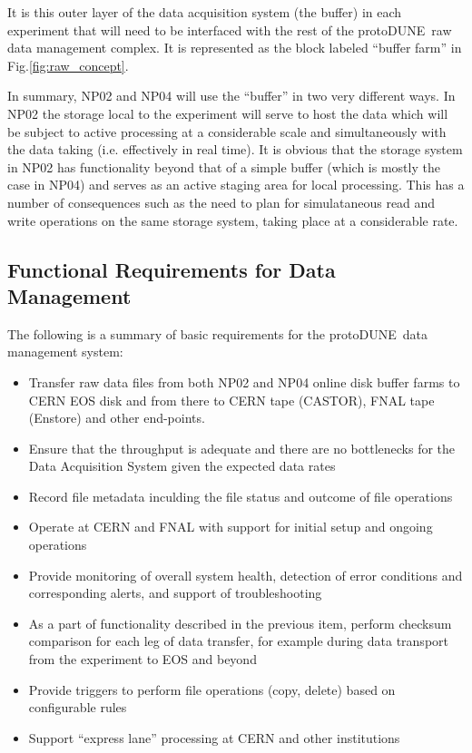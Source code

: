 \documentclass[pdftex,12pt,letter]{article}
\newcommand{\pd}{protoDUNE\ }
\begin{document}
\noindent
It is this outer layer of the data acquisition system (the buffer) in each experiment that will need to be interfaced with
the rest of the \pd raw data management complex.  It is represented as the block labeled ``buffer farm'' in Fig.\ref{fig:raw_concept}.

In summary, NP02 and NP04 will use the ``buffer'' in two very different ways.  In NP02
the storage local to the experiment will serve to host the data which will be subject to active processing at a considerable scale
and simultaneously with the data taking (i.e. effectively in real time).
It is obvious that the storage system in NP02 has functionality beyond that of a simple buffer (which is mostly the case in NP04)
and serves as an active staging area for local processing. This has a number of consequences such as the need to plan
for simulataneous read and write operations on the same storage system, taking place at a considerable rate.

\subsection{Functional Requirements for Data Management}
\label{sec:func_reqs}
The following is a summary of basic requirements for the \pd data management system:
\begin{itemize}

\item Transfer raw data files from both NP02 and NP04 online disk buffer farms
to CERN EOS disk and from there to CERN tape (CASTOR), FNAL tape (Enstore) and other end-points.

\item Ensure that the throughput is adequate and there are no bottlenecks for the Data Acquisition System
given the expected data rates

\item Record file metadata inculding the file status and outcome of file operations

\item Operate at CERN and FNAL with support for initial setup and ongoing operations

\item Provide monitoring of overall system health, detection of error conditions and corresponding alerts, and support of troubleshooting

\item As a part of functionality described in the previous item, perform checksum comparison for each leg of data transfer, for
example during data transport from the experiment to EOS and beyond

\item Provide triggers to perform file operations (copy, delete) based on configurable rules

\item Support ``express lane'' processing at CERN and other institutions

\end{itemize}
\end{document}

